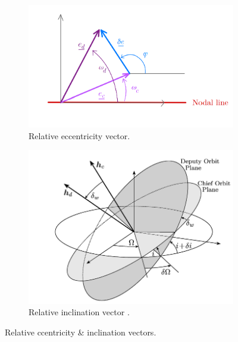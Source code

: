 	\begin{figure}[ht]
	\centering
	\medskip
	\begin{subfigure}[t]{.52\linewidth}
	\centering\includegraphics[width=\linewidth]{Appendices/Appendix_A/ECC_vector}
	\caption{Relative eccentricity vector.}
	\label{fig: 	ECC_vector}
	\end{subfigure}
	\begin{subfigure}[t]{.44\linewidth}
	\centering\includegraphics[width=\linewidth]{Appendices/Appendix_A/inc_vector}
	\caption{Relative inclination vector \cite{Schaub2004} .}
	\label{fig: 	inc_vector}
	\end{subfigure}
	\caption{Relative ccentricity \& inclination vectors. }
	\end{figure}
	\FloatBarrier
